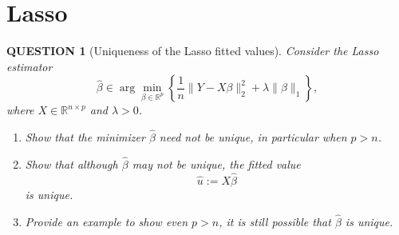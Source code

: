 \documentclass[12pt]{article}
\renewcommand{\(}{\left(}%
\renewcommand{\)}{\right)}%
\renewcommand{\[}{\left[}%
\renewcommand{\]}{\right]}%
\newtheorem{question}{QUESTION}[section]}
\begin{document}
\section{Lasso}
\begin{question}[Uniqueness of the Lasso fitted values]
Consider the Lasso estimator
\begin{equation*}
\hat\beta \in 
\arg\min_{\beta\in\mathbb{R}^p}
\left\{
\frac{1}{n}\|Y-X\beta\|_2^2+\lambda\|\beta\|_1
\right\},
\end{equation*}
where $X\in\mathbb{R}^{n\times p}$ and $\lambda>0$.

\begin{enumerate}
\item Show that the minimizer $\hat\beta$ need not be unique, in particular when $p>n$. 
\item Show that although $\hat\beta$ may not be unique, the fitted value
\begin{equation*}
\hat u := X\hat\beta
\end{equation*}
is unique.
\item Provide an example to show even $p>n$, it is still possible that $\hat\beta$ is unique.
\end{enumerate}
\end{question}
\end{document}
